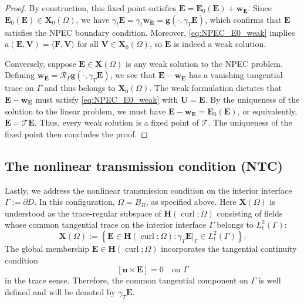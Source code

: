 \documentclass[12pt,reqno]{amsart}
\theoremstyle{definition}
\numberwithin{equation}{section}
\begin{document}
\begin{proof}
By construction, this fixed point satisfies $\mathbf{E} = \mathbf{E}_0(\mathbf{E}) + \mathbf{w}_{\mathbf{E}}$. Since $\mathbf{E}_0(\mathbf{E}) \in \mathbf{X}_0(\Omega)$, we have $\gamma_t \mathbf{E} = \gamma_t \mathbf{w}_{\mathbf{E}} = \mathbf{g}(\cdot, \gamma_T \mathbf{E})$, which confirms that $\mathbf{E}$ satisfies the NPEC boundary condition. Moreover, \eqref{eq:NPEC_E0_weak} implies $a(\mathbf{E}, \mathbf{V}) = \langle \mathbf{F}, \mathbf{V} \rangle$ for all $\mathbf{V} \in \mathbf{X}_0(\Omega)$, so $\mathbf{E}$ is indeed a weak solution.

Conversely, suppose $\mathbf{E} \in \mathbf{X}(\Omega)$ is any weak solution to the NPEC problem. Defining $\mathbf{w}_{\mathbf{E}} = \mathcal{R}_\Gamma \mathbf{g}(\cdot, \gamma_T \mathbf{E})$, we see that $\mathbf{E} - \mathbf{w}_{\mathbf{E}}$ has a vanishing tangential trace on $\Gamma$ and thus belongs to $\mathbf{X}_0(\Omega)$. The weak formulation dictates that $\mathbf{E} - \mathbf{w}_{\mathbf{E}}$ must satisfy \eqref{eq:NPEC_E0_weak} with $\mathbf{U} = \mathbf{E}$. By the uniqueness of the solution to the linear problem, we must have $\mathbf{E} - \mathbf{w}_{\mathbf{E}} = \mathbf{E}_0(\mathbf{E})$, or equivalently, $\mathbf{E} = \mathcal{T}\mathbf{E}$. Thus, every weak solution is a fixed point of $\mathcal{T}$. The uniqueness of the fixed point then concludes the proof.
\end{proof}


\subsection{The nonlinear transmission condition (NTC)}

Lastly, we address the nonlinear transmission condition on the interior
interface \(\Gamma:=\partial D\). In this configuration, \(\Omega=B_R\), as
specified above. Here \(\mathbf X(\Omega)\) is understood as the trace-regular
subspace of \(\mathbf H(\operatorname{curl};\Omega)\) consisting of fields
whose common tangential trace on the interior interface \(\Gamma\) belongs to
\(L_t^2(\Gamma)\):
\[
\mathbf X(\Omega)
:=
\left\{
\mathbf E\in \mathbf H(\operatorname{curl};\Omega):
\gamma_T\mathbf E|_{\Gamma}\in L_t^2(\Gamma)
\right\}.
\]
The global membership \(\mathbf E\in \mathbf H(\operatorname{curl};\Omega)\)
incorporates the tangential continuity condition
\[
[\mathbf n\times \mathbf E]=0
\quad\text{on }\Gamma
\]
in the trace sense. Therefore, the common tangential component on \(\Gamma\)
is well defined and will be denoted by \(\gamma_T\mathbf E\).
\end{document}
